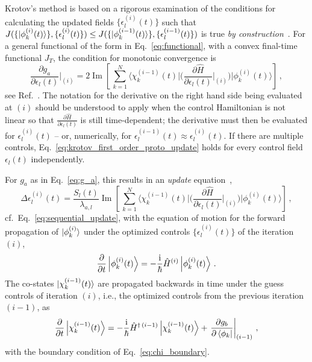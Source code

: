 \documentclass[submission, Phys]{SciPost}
\newcommand{\Op}[1]{\hat{#1}}
\renewcommand{\Im}[0]{\operatorname{Im}}
\begin{document}
Krotov's method is based on a rigorous examination of the conditions for
calculating the updated fields $\{\epsilon_l^{(i)}(t)\}$ such that
\(J(\{\ket{\phi_k^{(i)}(t)}\}, \{\epsilon_l^{(i)}(t)\}) \leq
J(\{\ket{\phi_k^{(i-1)}(t)}\}, \{\epsilon_l^{(i-1)}(t)\})\) is true
\emph{by construction}~\cite{Krotov.book,KonnovARC99,PalaoPRA2003,SklarzPRA2002,ReichJCP12}.
For a general functional of the form in Eq.~\eqref{eq:functional}, with a convex
final-time functional $J_T$, the condition for monotonic convergence is
\begin{equation}%
  \label{eq:krotov_first_order_proto_update}
  \frac{\partial g_a}{\partial \epsilon_l(t)}\bigg\vert_{(i)}
  =  2 \Im \left[\,
      \sum_{k=1}^{N} \Bigg\langle \chi_k^{(i-1)}(t) \Bigg\vert \Bigg(
      \frac{\partial \Op{H}}{\partial \epsilon_l(t)}\bigg\vert_{
      (i)} \Bigg)
      \Bigg\vert \phi_k^{(i)}(t) \Bigg\rangle
    \right]\,,
\end{equation}
see Ref.~\cite{PalaoPRA2003}.
The notation for the derivative on the right hand side being evaluated at
${(i)}$ should be understood to apply when the control Hamiltonian is not linear
so that $\frac{\partial \Op{H}}{\partial \epsilon_l(t)}$ is still
time-dependent; the derivative must then be evaluated for $\epsilon^{(i)}_l(t)$
-- or, numerically, for $\epsilon^{(i-1)}_l(t) \approx \epsilon^{(i)}_l(t)$.
If there are multiple controls, Eq.~\eqref{eq:krotov_first_order_proto_update}
holds for every control field $\epsilon_l(t)$ independently.

For \(g_a\) as in Eq.~\eqref{eq:g_a}, this results in an
\emph{update} equation~\cite{Tannor92,PalaoPRA2003,SklarzPRA2002},
\begin{equation}%
  \label{eq:krotov_first_order_update}
  \Delta\epsilon^{(i)}_l(t)
  = \frac{S_l(t)}{\lambda_{a,l}} \Im \left[\,
      \sum_{k=1}^{N} \Bigg\langle \chi_k^{(i-1)}(t) \Bigg\vert \Bigg(
      \frac{\partial \Op{H}}{\partial \epsilon_l(t)}
      \bigg\vert_{(i)} \Bigg)
      \Bigg\vert \phi_k^{(i)}(t) \Bigg\rangle
    \right]\,,
\end{equation}
cf.~Eq.~\eqref{eq:sequential_update}, with the equation of motion for the
forward propagation of $\ket{\phi_k^{(i)}}$ under the optimized controls
$\{\epsilon_l^{(i)}(t)\}$ of the iteration $(i)$,
\begin{equation}%
  \label{eq:fw_eqm}
  \frac{\partial}{\partial t} \Ket{\phi_k^{(i)}(t)} =
  -\frac{\mathrm{i}}{\hbar} \Op{H}^{(i)} \Ket{\phi_k^{(i)}(t)}\,.
\end{equation}
The co-states \(\ket{\chi_k^{(i-1)}(t)}\) are propagated backwards in time under
the guess controls of iteration $(i)$, i.e., the optimized controls from the
previous iteration $(i-1)$, as
\begin{equation}%
  \label{eq:bw_eqm}
  \frac{\partial}{\partial t} \Ket{\chi_k^{(i-1)}(t)}
  = -\frac{\mathrm{i}}{\hbar} \Op{H}^{\dagger\,(i-1)} \Ket{\chi_k^{(i-1)}(t)}
    + \left.\frac{\partial g_b}{\partial \Bra{\phi_k}}\right\vert_{(i-1)}\,,
\end{equation}
with the boundary condition of Eq.~\eqref{eq:chi_boundary}.
\end{document}
